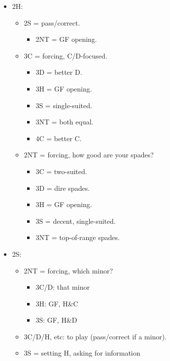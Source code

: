 \documentclass[a4paper,12pt]{article}
\begin{document}
\begin{itemize}
\item 2H:
	\begin{itemize}
   \item 2S = pass/correct.
		\begin{itemize}
      \item 2NT = GF opening.
		\end{itemize}
   \item 3C = forcing, C/D-focused.
		\begin{itemize}
      \item 3D = better D.
      \item 3H = GF opening.
      \item 3S = single-suited.
      \item 3NT = both equal.
      \item 4C = better C.
		\end{itemize}
   \item 2NT = forcing, how good are your spades?
		\begin{itemize}
      \item 3C = two-suited.
      \item 3D = dire spades.
      \item 3H = GF opening.
      \item 3S = decent, single-suited.
      \item 3NT = top-of-range spades.
		\end{itemize}
	\end{itemize}

\item 2S:
	\begin{itemize}
   \item 2NT = forcing, which minor?
		\begin{itemize}
      \item 3C/D: that minor
      \item 3H: GF, H\&C
      \item 3S: GF, H\&D
		\end{itemize}
   \item 3C/D/H, etc: to play (pass/correct if a minor).
   \item 3S = setting H, asking for information
	\end{itemize}


\end{itemize}
\end{document}
